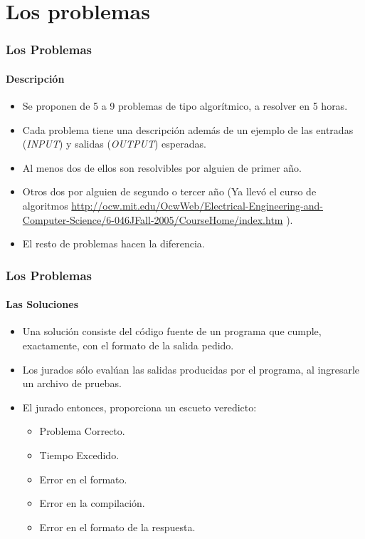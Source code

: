 \documentclass{beamer}
\begin{document}
\section{Los problemas}
\begin{frame}
 \frametitle{Los Problemas}
 \framesubtitle{Descripción}
 \begin{itemize}
  \item Se proponen de 5 a 9 problemas de tipo algorítmico, a resolver en 5 horas.
  \item Cada problema tiene una descripción además de un ejemplo de las entradas (\emph{INPUT}) y salidas (\emph{OUTPUT}) esperadas.
  \item Al menos dos de ellos son resolvibles por alguien de primer año.
  \item Otros dos por alguien de segundo o tercer año (Ya llevó el curso de algoritmos \url{http://ocw.mit.edu/OcwWeb/Electrical-Engineering-and-Computer-Science/6-046JFall-2005/CourseHome/index.htm} ).
  \item El resto de problemas hacen la diferencia. 
 \end{itemize} 
\end{frame}

\begin{frame}
 \frametitle{Los Problemas}
 \framesubtitle{Las Soluciones}
 \begin{itemize}
  \item Una solución consiste del código fuente de un programa que cumple, exactamente, con el formato de la salida pedido.
  \item Los jurados sólo evalúan las salidas producidas por el programa, al ingresarle un archivo de pruebas.
  \item El jurado entonces, proporciona un escueto veredicto:
  \begin{itemize}
   \item Problema Correcto.
   \item Tiempo Excedido.
   \item Error en el formato.
   \item Error en la compilación.
   \item Error en el formato de la respuesta.
  \end{itemize}
 \end{itemize}

\end{frame}
\end{document}
